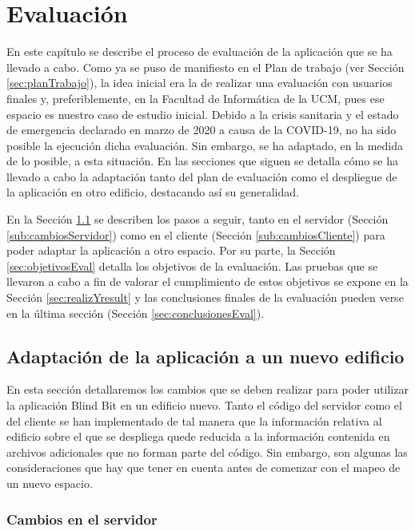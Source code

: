 \chapter{Evaluación}
\label{cap:evaluacion}

En este capítulo se describe el proceso de evaluación de la aplicación que se ha llevado a cabo. Como ya se puso de manifiesto en el Plan de trabajo (ver Sección \ref{sec:planTrabajo}), la idea inicial era la de realizar una evaluación con usuarios finales y, preferiblemente, en la Facultad de Informática de la UCM, pues ese espacio es nuestro caso de estudio inicial. Debido a la crisis sanitaria y el estado de emergencia declarado en marzo de 2020 a causa de la COVID-19, no ha sido posible la ejecución dicha evaluación. Sin embargo, se ha adaptado, en la medida de lo posible, a esta situación. En las secciones que siguen se detalla cómo se ha llevado a cabo la adaptación tanto del plan de evaluación como el despliegue de la aplicación en otro edificio, destacando así su generalidad. 

En la Sección \ref{sec:adaptacionApp} se describen los pasos a seguir, tanto en el servidor (Sección \ref{sub:cambiosServidor}) como en el cliente (Sección \ref{sub:cambiosCliente}) para poder adaptar la aplicación a otro espacio. Por su parte, la Sección \ref{sec:objetivosEval} detalla los objetivos de la evaluación. Las pruebas que se llevaron a cabo a fin de valorar el cumplimiento de estos objetivos se expone en la Sección \ref{sec:realizYresult} y las conclusiones finales de la evaluación pueden verse en la última sección (Sección \ref{sec:conclusionesEval}). 


\section{Adaptación de la aplicación a un nuevo edificio}
\label{sec:adaptacionApp}

En esta sección detallaremos los cambios que se deben realizar para poder utilizar la aplicación Blind Bit en un edificio nuevo. Tanto el código del servidor como el del cliente se han implementado de tal manera que la información relativa al edificio sobre el que se despliega quede reducida a la información contenida en archivos adicionales que no forman parte del código. Sin embargo, son algunas las consideraciones que hay que tener en cuenta antes de comenzar con el mapeo de un nuevo espacio. 

\subsection{Cambios en el servidor}
\label{sub:cambiosServidor_vivienda}

